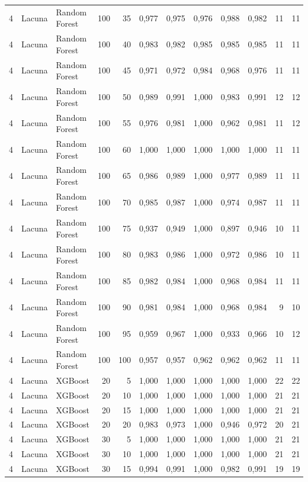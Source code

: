 \begin{longtable}{@{}rllrrrrrrrrr@{}}
4 & Lacuna & Random Forest & 100 & 35 & 0,977 & 0,975 & 0,976 & 0,988 & 0,982 & 11 & 11 \\
4 & Lacuna & Random Forest & 100 & 40 & 0,983 & 0,982 & 0,985 & 0,985 & 0,985 & 11 & 11 \\
4 & Lacuna & Random Forest & 100 & 45 & 0,971 & 0,972 & 0,984 & 0,968 & 0,976 & 11 & 11 \\
4 & Lacuna & Random Forest & 100 & 50 & 0,989 & 0,991 & 1,000 & 0,983 & 0,991 & 12 & 12 \\
4 & Lacuna & Random Forest & 100 & 55 & 0,976 & 0,981 & 1,000 & 0,962 & 0,981 & 11 & 12 \\
4 & Lacuna & Random Forest & 100 & 60 & 1,000 & 1,000 & 1,000 & 1,000 & 1,000 & 11 & 11 \\
4 & Lacuna & Random Forest & 100 & 65 & 0,986 & 0,989 & 1,000 & 0,977 & 0,989 & 11 & 11 \\
4 & Lacuna & Random Forest & 100 & 70 & 0,985 & 0,987 & 1,000 & 0,974 & 0,987 & 11 & 11 \\
4 & Lacuna & Random Forest & 100 & 75 & 0,937 & 0,949 & 1,000 & 0,897 & 0,946 & 10 & 11 \\
4 & Lacuna & Random Forest & 100 & 80 & 0,983 & 0,986 & 1,000 & 0,972 & 0,986 & 10 & 11 \\
4 & Lacuna & Random Forest & 100 & 85 & 0,982 & 0,984 & 1,000 & 0,968 & 0,984 & 11 & 11 \\
4 & Lacuna & Random Forest & 100 & 90 & 0,981 & 0,984 & 1,000 & 0,968 & 0,984 & 9 & 10 \\
4 & Lacuna & Random Forest & 100 & 95 & 0,959 & 0,967 & 1,000 & 0,933 & 0,966 & 10 & 12 \\
4 & Lacuna & Random Forest & 100 & 100 & 0,957 & 0,957 & 0,962 & 0,962 & 0,962 & 11 & 11 \\
4 & Lacuna & XGBoost & 20 & 5 & 1,000 & 1,000 & 1,000 & 1,000 & 1,000 & 22 & 22 \\
4 & Lacuna & XGBoost & 20 & 10 & 1,000 & 1,000 & 1,000 & 1,000 & 1,000 & 21 & 21 \\
4 & Lacuna & XGBoost & 20 & 15 & 1,000 & 1,000 & 1,000 & 1,000 & 1,000 & 21 & 21 \\
4 & Lacuna & XGBoost & 20 & 20 & 0,983 & 0,973 & 1,000 & 0,946 & 0,972 & 20 & 21 \\
4 & Lacuna & XGBoost & 30 & 5 & 1,000 & 1,000 & 1,000 & 1,000 & 1,000 & 21 & 21 \\
4 & Lacuna & XGBoost & 30 & 10 & 1,000 & 1,000 & 1,000 & 1,000 & 1,000 & 21 & 21 \\
4 & Lacuna & XGBoost & 30 & 15 & 0,994 & 0,991 & 1,000 & 0,982 & 0,991 & 19 & 19 \\

\end{longtable}
